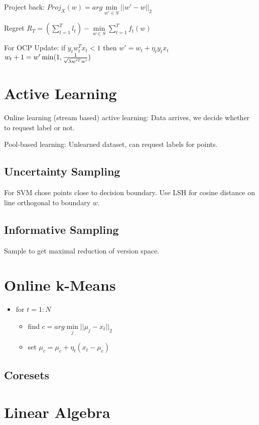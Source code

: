 \documentclass[a4paper,11pt,twocolumn]{article}
\begin{document}
Project back: $Proj_X(w) = arg \min \limits_{w' \in S} ||w' - w||_2$

Regret $R_T = (\sum \limits_{t=1}^T l_t) - \min \limits_{w \in S} \sum \limits_{t=1}^T f_t(w)$

For OCP Update: if $y_t w_t^T x_t < 1$ then 
$w'=w_t+\eta_t y_t x_t$
$w_t+1 = w' \min (1,{{1}\over{\sqrt{\lambda w'^T w'}}})$


\section{Active Learning}
Online learning (stream based) active learning: Data arrives, we decide whether to request label or not.

Pool-based learning: Unlearned dataset, can request labels for points.

\subsection{Uncertainty Sampling}
For SVM chose points close to decision boundary. Use LSH for cosine distance on line orthogonal to boundary $w$.

\subsection{Informative Sampling}
Sample to get maximal reduction of version space.


\section{Online k-Means}
\begin{itemize}[noitemsep,topsep=0pt,parsep=0pt,partopsep=0pt]
\item for $t=1:N$
\begin{itemize}[noitemsep,topsep=0pt,parsep=0pt,partopsep=0pt]
\item find $c = arg \min \limits_j ||\mu_j - x_t ||_2$
\item set $ \mu_c = \mu_c+ \eta_t ( x_t - \mu_c)$
\end{itemize}
\end{itemize}

\subsection{Coresets}



\section{Linear Algebra}
\end{document}
